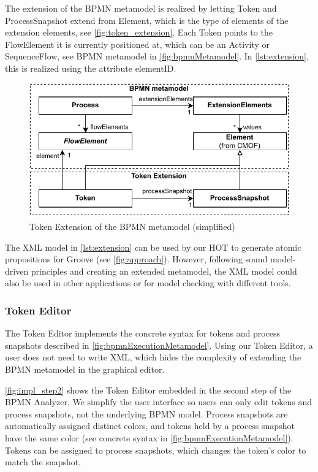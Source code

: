 \documentclass{lmcs} %
\begin{document}
The extension of the BPMN metamodel is realized by letting \textsf{Token} and \textsf{ProcessSnapshot} extend from \textsf{Element}, which is the type of elements of the extension elements, see \autoref{fig:token_extension}.
Each \textsf{Token} points to the \textsf{FlowElement} it is currently positioned at, which can be an \textsf{Activity} or \textsf{SequenceFlow}, see BPMN metamodel in \autoref{fig:bpmnMetamodel}.
In \autoref{lst:extension}, this is realized using the attribute \textsf{elementID}.

\begin{figure}[ht]
    \centering
    \includegraphics[width=.6\textwidth]{images/bpmn_extension.pdf}
    \caption{Token Extension of the BPMN metamodel (simplified)}
    \label{fig:token_extension}
\end{figure}

The XML model in \autoref{lst:extension} can be used by our HOT to generate atomic propositions for Groove (see \autoref{fig:approach}).
However, following sound model-driven principles and creating an extended metamodel, the XML model could also be used in other applications or for model checking with different tools.

\subsubsection{Token Editor}
The Token Editor implements the concrete syntax for tokens and process snapshots described in \autoref{fig:bpmnExecutionMetamodel}.
Using our Token Editor, a user does not need to write XML, which hides the complexity of extending the BPMN metamodel in the graphical editor.

\autoref{fig:impl_step2} shows the Token Editor embedded in the second step of the BPMN Analyzer.
We simplify the user interface so users can only edit tokens and process snapshots, not the underlying BPMN model.
Process snapshots are automatically assigned distinct colors, and tokens held by a process snapshot have the same color (see concrete syntax in \autoref{fig:bpmnExecutionMetamodel}).
Tokens can be assigned to process snapshots, which changes the token's color to match the snapshot.
\end{document}
